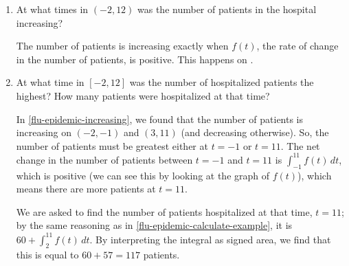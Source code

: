 \documentclass{article}
\begin{document}
\begin{enumerate}
\begin{enumerate}
    \item \label{flu-epidemic-increasing} 
      \begin{problem}[\vfill]      
        At what times in $(-2, 12)$ was the number of patients in the
        hospital increasing?
      \end{problem}

      \begin{solution}
        The number of patients is increasing exactly when $f(t)$, the rate
        of change in the number of patients, is positive.  This happens on
        .
      \end{solution}

    \item
      \begin{problem}[\vfill\newpage]
        At what time in $[-2, 12]$ was the number of hospitalized patients
        the highest?  How many patients were hospitalized at that time? 
      \end{problem}

      \begin{solution}
        In \ref{flu-epidemic-increasing}, we found that the number of
        patients is increasing on $(-2, -1)$ and $(3, 11)$ (and decreasing
        otherwise).  So, the number of patients must be greatest either at
        $t = -1$ or $t = 11$.  The net change in the number of patients
        between $t = -1$ and $t = 11$ is $\displaystyle \int_{-1}^{11}
        f(t)\,dt$, which is positive (we can see this by looking at the graph
        of $f(t)$), which means there are more patients at $\boxed{t =
          11}$.

        We are asked to find the number of patients hospitalized at that
        time, $t = 11$; by the same reasoning as in
        \ref{flu-epidemic-calculate-example}, it is $60 + \displaystyle
        \int_2^{11} f(t)\,dt$.  By interpreting the integral as signed area,
        we find that this is equal to $60 + 57 = \boxed{117}$ patients. 
      \end{solution}

    \end{enumerate}



\end{enumerate}
\end{document}
